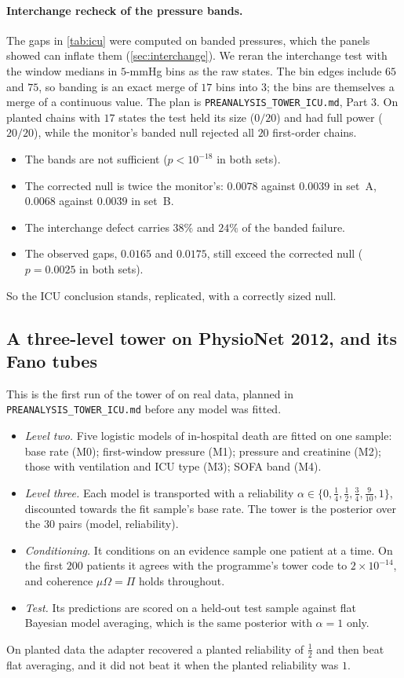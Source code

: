 \documentclass[11pt]{article}
\theoremstyle{definition}
\theoremstyle{remark}
\begin{document}
\paragraph{Interchange recheck of the pressure bands.} The gaps in \cref{tab:icu} were computed on banded pressures, which the panels
showed can inflate them (\cref{sec:interchange}). We reran the interchange test with the window medians in $5$-mmHg bins as the raw
states. The bin edges include $65$ and $75$, so banding is an exact merge of $17$ bins into $3$; the bins are themselves a merge of a
continuous value. The plan is \texttt{PREANALYSIS\_TOWER\_ICU.md}, Part 3. On planted chains with $17$ states the test held its size
($0/20$) and had full power ($20/20$), while the monitor's banded null rejected all $20$ first-order chains.
\begin{itemize}[leftmargin=*,nosep]
\item The bands are not sufficient ($p<10^{-18}$ in both sets).
\item The corrected null is twice the monitor's: $0.0078$ against $0.0039$ in set~A, $0.0068$ against $0.0039$ in set~B.
\item The interchange defect carries $38\%$ and $24\%$ of the banded failure.
\item The observed gaps, $0.0165$ and $0.0175$, still exceed the corrected null ($p=0.0025$ in both sets).
\end{itemize}
So the ICU conclusion stands, replicated, with a correctly sized null.

\subsection{A three-level tower on PhysioNet 2012, and its Fano tubes}\label{sec:towericu}

This is the first run of the tower of \cite{Tower} on real data, planned in \texttt{PREANALYSIS\_TOWER\_ICU.md} before any model was
fitted.
\begin{itemize}[leftmargin=*,nosep]
\item \emph{Level two.} Five logistic models of in-hospital death are fitted on one sample: base rate (M0); first-window pressure (M1);
  pressure and creatinine (M2); those with ventilation and ICU type (M3); SOFA band (M4).
\item \emph{Level three.} Each model is transported with a reliability $\alpha\in\{0,\frac14,\frac12,\frac34,\frac9{10},1\}$, discounted
  towards the fit sample's base rate. The tower is the posterior over the $30$ pairs (model, reliability).
\item \emph{Conditioning.} It conditions on an evidence sample one patient at a time. On the first $200$ patients it agrees with the
  programme's tower code to $2\times10^{-14}$, and coherence $\mu\Omega=\Pi$ holds throughout.
\item \emph{Test.} Its predictions are scored on a held-out test sample against flat Bayesian model averaging, which is the same
  posterior with $\alpha=1$ only.
\end{itemize}
On planted data the adapter recovered a planted reliability of $\frac12$ and then beat flat averaging, and it did not beat it when the
planted reliability was $1$.
\end{document}
